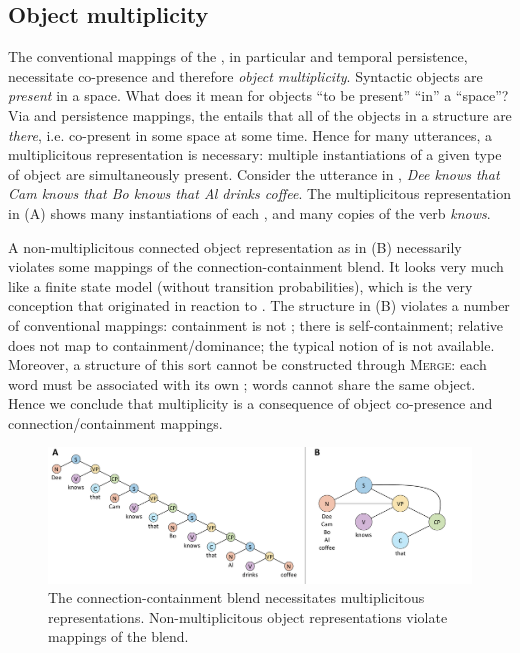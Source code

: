 \subsection{Object multiplicity}

The conventional mappings of the , in particular  and temporal persistence, necessitate co-presence and therefore \textit{object multiplicity}. Syntactic objects are \textit{present} in a space. What does it mean for objects “to be present” “in” a “space”? Via  and persistence mappings, the  entails that all of the objects in a structure are \textit{there}, i.e. co-present in some space at some time. Hence for many utterances, a multiplicitous representation is necessary: multiple instantiations of a given type of object are simultaneously present. Consider the utterance in {}, \textit{Dee knows that Cam knows that Bo knows that Al drinks coffee}. The multiplicitous representation in (A) shows many instantiations of each , and many copies of the verb \textit{knows}.

  A non-multiplicitous connected object representation as in (B) necessarily violates some mappings of the connection-con\-tain\-ment blend. It looks very much like a finite state model (without transition probabilities), which is the very conception that  originated in reaction to \citep{Chomsky1956}. The structure in (B) violates a number of conventional mappings: containment is not ; there is self-containment; relative  does not map to containment/dominance; the typical notion of  is not available. Moreover, a structure of this sort cannot be constructed through \textsc{Merge}: each word must be associated with its own ; words cannot share the same object. Hence we conclude that multiplicity is a consequence of object co-presence and connection/containment mappings.

  
\begin{figure}
\includegraphics[width=\textwidth]{figures/Tilsen-img36.png}
\caption{The connection-containment blend necessitates multiplicitous representations. Non-multiplicitous object representations violate mappings of the blend.}
\label{fig:3:8}
\end{figure}
 

